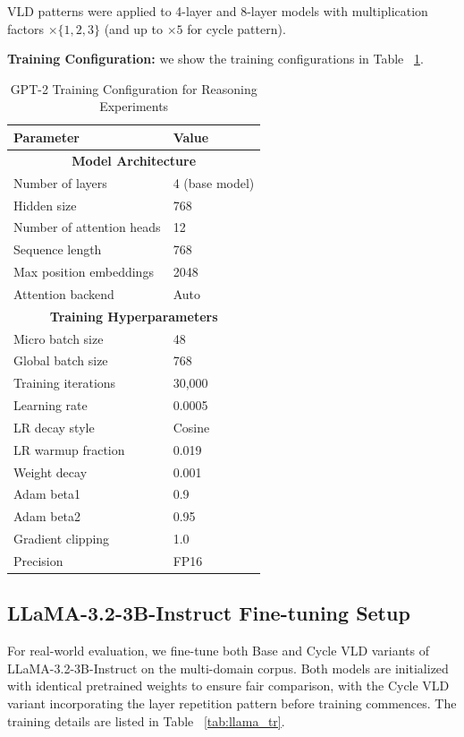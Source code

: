 \documentclass{article} %
\begin{document}
VLD patterns were applied to 4-layer and 8-layer models with multiplication factors $\times\{1,2,3\}$ (and up to $\times 5$ for cycle pattern).

\textbf{Training Configuration:} we show the training configurations in Table ~\ref{tab:e2}.
\begin{table}[h]
\centering
\caption{GPT-2 Training Configuration for Reasoning Experiments}
\begin{tabular}{ll}
\toprule
\textbf{Parameter} & \textbf{Value} \\
\midrule
\multicolumn{2}{c}{\textbf{Model Architecture}} \\
Number of layers & 4 (base model) \\
Hidden size & 768 \\
Number of attention heads & 12 \\
Sequence length & 768 \\
Max position embeddings & 2048 \\
Attention backend & Auto \\
\midrule
\multicolumn{2}{c}{\textbf{Training Hyperparameters}} \\
Micro batch size & 48 \\
Global batch size & 768 \\
Training iterations & 30,000 \\
Learning rate & 0.0005 \\
LR decay style & Cosine \\
LR warmup fraction & 0.019 \\
Weight decay & 0.001 \\
Adam beta1 & 0.9 \\
Adam beta2 & 0.95 \\
Gradient clipping & 1.0 \\
Precision & FP16 \\
\bottomrule
\end{tabular}
\label{tab:e2}
\end{table}



\subsection{LLaMA-3.2-3B-Instruct Fine-tuning Setup} \label{subsec:llama_setup}

For real-world evaluation, we fine-tune both Base and Cycle VLD variants of LLaMA-3.2-3B-Instruct on the multi-domain corpus. Both models are initialized with identical pretrained weights to ensure fair comparison, with the Cycle VLD variant incorporating the layer repetition pattern before training commences. The training details are listed in Table ~\ref{tab:llama_tr}.
\end{document}
